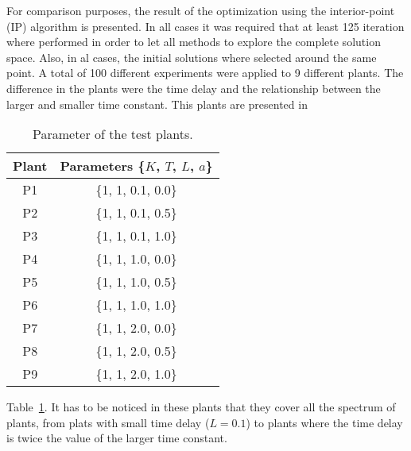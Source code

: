For comparison purposes, the result of the optimization using the interior-point (IP) algorithm is presented. In all cases it was required that at least 125 iteration where performed in order to let all methods to explore the complete solution space. Also, in al cases, the initial solutions where selected around the same point. A total of 100 different experiments were applied to 9 different plants. The difference in the plants were the time delay and the relationship between the larger and smaller time constant. This plants are presented in %
%
\begin{table}[tb]%
	\centering
	\caption{Parameter of the test plants.}
	\label{tab:Plants}
	\begin{tabular}{cc}
		\toprule
		Plant & Parameters \{$K$, $T$, $L$, $a$\}\\
		\midrule
		P1 & \{1, 1, 0.1, 0.0\}\\
		P2 & \{1, 1, 0.1, 0.5\}\\
		P3 & \{1, 1, 0.1, 1.0\}\\
		P4 & \{1, 1, 1.0, 0.0\}\\
		P5 & \{1, 1, 1.0, 0.5\}\\
		P6 & \{1, 1, 1.0, 1.0\}\\
		P7 & \{1, 1, 2.0, 0.0\}\\
		P8 & \{1, 1, 2.0, 0.5\}\\
		P9 & \{1, 1, 2.0, 1.0\}\\
		\bottomrule
	\end{tabular}
\end{table}
%
Table~\ref{tab:Plants}. It has to be noticed in these plants that they cover all the spectrum of plants, from plats with small time delay ($L=0.1$) to plants where the time delay is twice the value of the larger time constant.

